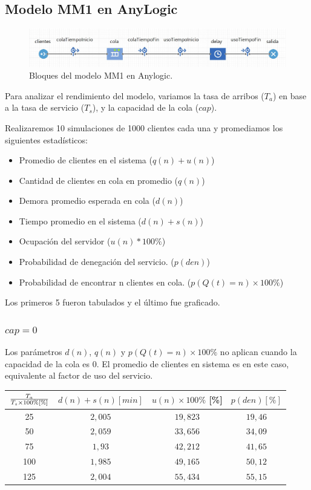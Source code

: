 \subsection{Modelo MM1 en AnyLogic}

\begin{figure}[H]
  \includegraphics[width=\linewidth]{images/anylogic-colas-modelo}
  \caption{Bloques del modelo MM1 en Anylogic.}
\end{figure}

Para analizar el rendimiento del modelo, variamos la tasa de arribos ($T_a$) en base a la tasa de servicio ($T_s$), y
la capacidad de la cola ($cap$).

Realizaremos 10 simulaciones de 1000 clientes cada una y promediamos los siguientes estadísticos:
\begin{itemize}
    \item Promedio de clientes en el sistema ($q(n)+u(n)$)
    \item Cantidad de clientes en cola en promedio ($q(n)$)
    \item Demora promedio esperada en cola ($d(n)$)
    \item Tiempo promedio en el sistema ($d(n)+s(n)$)
    \item Ocupación del servidor ($u(n)*100\%$)
    \item Probabilidad de denegación del servicio. ($p(den)$)
    \item Probabilidad de encontrar n clientes en cola. ($p(Q(t)=n)\times100\%$)
\end{itemize}

Los primeros 5 fueron tabulados y el último fue graficado.

\subsubsection{$cap = 0$}

Los parámetros $d(n)$, $q(n)$ y $p(Q(t)=n)\times100\%$ no aplican cuando la capacidad de la cola es 0.
El promedio de clientes en sistema es en este caso, equivalente al factor de uso del servicio.

\begin{tabular}{||c||c|c|c||}
    \hline \hline
    $T_a \over T_s\times100\% [\%]$ & $d(n)+s(n) [min]$ & $u(n)\times100\%$ [\%] & $p(den) [\%]$ \\
    \hline \hline
    25 & $2,005$ & $19,823$ & $19,46$ \\
    \hline
    50 & $2,059$ & $33,656$ & $34,09$ \\
    \hline
    75 & $1,93$ & $42,212$ & $41,65$ \\
    \hline
    100 & $1,985$ & $49,165$ & $50,12$ \\
    \hline
    125 & $2,004$ & $55,434$ & $55,15$ \\
    \hline \hline
\end{tabular}

